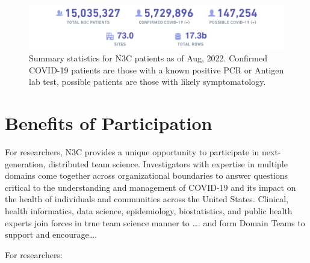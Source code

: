 \documentclass[
  letterpaper,
  DIV=11,
  numbers=noendperiod]{scrreprt}
\begin{document}
\begin{figure}

{\centering \includegraphics[width=1\textwidth,height=\textheight]{chapters/images/intro/image-03-summary-stats.png}

}

\caption{\label{fig-intro-summary-stats}Summary statistics for N3C
patients as of Aug, 2022. Confirmed COVID-19 patients are those with a
known positive PCR or Antigen lab test, possible patients are those with
likely symptomatology.}

\end{figure}

\hypertarget{benefits-of-participation}{%
\section{Benefits of Participation}\label{benefits-of-participation}}

For researchers, N3C provides a unique opportunity to participate in
next-generation, distributed team science. Investigators with expertise
in multiple domains come together across organizational boundaries to
answer questions critical to the understanding and management of
COVID-19 and its impact on the health of individuals and communities
across the United States. Clinical, health informatics, data science,
epidemiology, biostatistics, and public health experts join forces in
true team science manner to \ldots. and form Domain Teams to support and
encourage\ldots.

For researchers:
\end{document}
